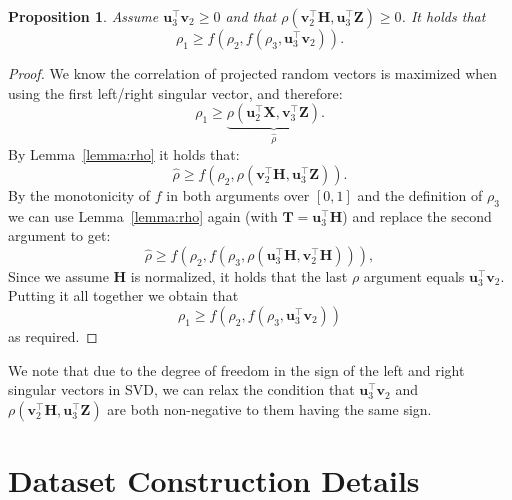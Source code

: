 \documentclass[11pt]{article}
\newcommand{\rv}[1]{\mathbf{#1}}
\newcommand{\myvec}[1]{\mathbf{#1}}
\newtheorem{proposition}{Proposition}
\begin{document}
\begin{proposition}
Assume $\myvec{u}_3^{\top} \myvec{v}_2 \ge 0$ and that $\rho(\myvec{v}_2^{\top} \rv{H}, \myvec{u}_3^{\top}\rv{Z}) \ge 0$.
It holds that
\begin{equation}
    \rho_1 \ge f(\rho_2, f(\rho_3, \myvec{u}_3^{\top} \myvec{v}_2)).
\end{equation}
\label{prop:1}
\end{proposition}
\begin{proof}
We know the correlation of projected random vectors
is maximized when using the first left/right singular vector, and therefore:
    \begin{equation}
    \rho_1 \ge \underbrace{\rho(\myvec{u}_2^{\top}\rv{X}, \myvec{v}_3^{\top}\rv{Z})}_{\hat{\rho}}.
    \end{equation}
    By Lemma~\ref{lemma:rho} it holds that:
    \begin{equation}
    \hat{\rho} \ge f(\rho_2, \rho(\myvec{v}_2^{\top} \rv{H}, \myvec{u}_3^{\top}\rv{Z})).
\end{equation}
    By the monotonicity of $f$ in both arguments over $[0,1]$ and the definition of $\rho_3$ we can use Lemma~\ref{lemma:rho} again (with $\rv{T} = \myvec{u}_3^{\top} \rv{H}$) and replace the second argument
    to get:
    \begin{equation}
        \hat{\rho} \ge f(\rho_2, f(\rho_3,  \rho(\myvec{u}_3^{\top} \rv{H}, \myvec{v}_2^{\top} \rv{H}))),
    \end{equation}
    Since we assume $\rv{H}$ is normalized, it holds that the last $\rho$ argument equals $\myvec{u}_3^{\top} \myvec{v}_2$.
    Putting it all together we obtain that
    \begin{equation}
        \rho_1 \ge f(\rho_2, f(\rho_3, \myvec{u}_3^{\top} \myvec{v}_2))
    \end{equation}
    as required.
\end{proof}

We note that due to the degree of freedom in the sign of the left and right singular vectors in SVD, we can relax the condition that $\myvec{u}_3^{\top} \myvec{v}_2$ and $\rho(\myvec{v}_2^{\top} \rv{H}, \myvec{u}_3^{\top}\rv{Z})$ are both non-negative to them having the same sign.


\section{Dataset Construction Details}
\label{app:data-processing}
\end{document}
